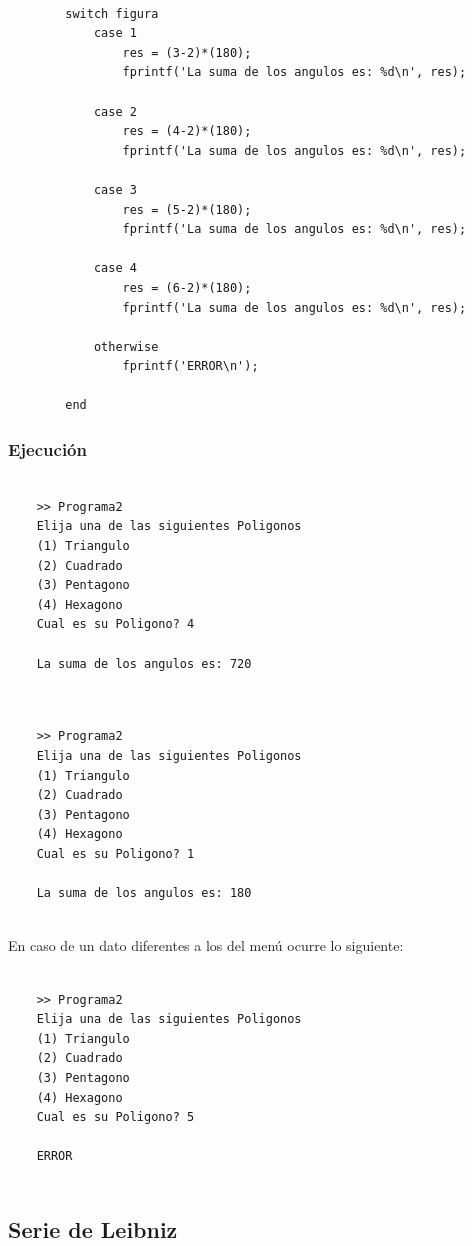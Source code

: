 \documentclass{article}
\begin{document}
	\begin{lstlisting}
		
		switch figura
			case 1
				res = (3-2)*(180);
				fprintf('La suma de los angulos es: %d\n', res);
				
			case 2
				res = (4-2)*(180);
				fprintf('La suma de los angulos es: %d\n', res);
				
			case 3
				res = (5-2)*(180);
				fprintf('La suma de los angulos es: %d\n', res);
				
			case 4
				res = (6-2)*(180);
				fprintf('La suma de los angulos es: %d\n', res);
				
			otherwise
				fprintf('ERROR\n');
				
		end
	\end{lstlisting}
	
	\subsubsection{Ejecución}
	
	\begin{lstlisting}
	
	>> Programa2
	Elija una de las siguientes Poligonos
	(1) Triangulo
	(2) Cuadrado
	(3) Pentagono
	(4) Hexagono
	Cual es su Poligono? 4
	
	La suma de los angulos es: 720
	
	\end{lstlisting}
	
	\begin{lstlisting}
	
	>> Programa2
	Elija una de las siguientes Poligonos
	(1) Triangulo
	(2) Cuadrado
	(3) Pentagono
	(4) Hexagono
	Cual es su Poligono? 1
	
	La suma de los angulos es: 180
	
	\end{lstlisting}
	
	En caso de un dato diferentes a los del menú ocurre lo siguiente:
	\\
	
	\begin{lstlisting}
	
	>> Programa2
	Elija una de las siguientes Poligonos
	(1) Triangulo
	(2) Cuadrado
	(3) Pentagono
	(4) Hexagono
	Cual es su Poligono? 5
	
	ERROR
	
	\end{lstlisting}
	
	\newpage
	
	\subsection{Serie de Leibniz}
	
\end{document}
